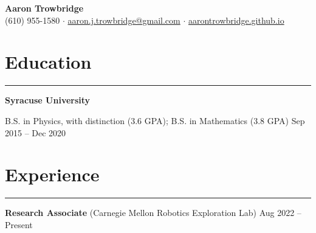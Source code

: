\documentclass[9pt]{extarticle}
\newcommand{\myline}{\rule[\baselineskip]{\linewidth}{1pt}}
\begin{document}
\begin{center}
\Huge
\textbf{Aaron Trowbridge}\\

\normalsize
(610) 955-1580 $\cdot$ \href{mailto:aaron.j.trowbridge@gmail.com}{aaron.j.trowbridge@gmail.com} $\cdot$ \href{https://aarontrowbridge.github.io/}{aarontrowbridge.github.io} \\

\end{center}


\section{Education}

\myline


\large\textbf{Syracuse University} 
\vspace{7pt}

\normalsize
\begin{compactitem}
\setlength\itemsep{0em}
\item B.S. in Physics, with distinction (3.6 GPA); B.S. in Mathematics (3.8 GPA) \hfill \small Sep 2015 -- Dec 2020 

\end{compactitem}


\section{Experience}

\myline




\vspace{7pt}
\large\textbf{Research Associate} \normalsize (Carnegie Mellon Robotics Exploration Lab) \hfill \small Aug 2022 -- Present 
\normalsize
\end{document}
